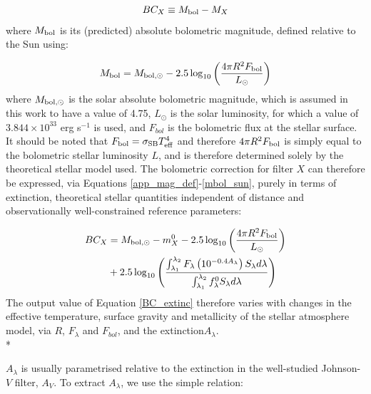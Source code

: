 \documentclass[12pt, a4paper]{report}
\begin{document}
\begin{equation}
BC_{X} \equiv M_{\textnormal{bol}} - M_{X}
\label{BC_def}
\end{equation}
where $M_{\textnormal{bol}}$ is its (predicted) absolute bolometric magnitude, defined relative to the Sun using:

\begin{equation}
M_{\textnormal{bol}} = M_{\textnormal{bol},\odot} - 2.5 \log_{10} \left( \frac{4\pi R^{2}F_{\textnormal{bol}}}{L_{\odot}} \right)
\label{mbol_sun}
\end{equation}
where $M_{\textnormal{bol},\odot}$ is the solar absolute bolometric magnitude, which is assumed in this work to have a value of 4.75, $L_{\odot}$ is the solar luminosity, for which a value of $3.844 \times 10^{33}$ erg s$^{-1}$ is used, and $F_{bol}$ is the bolometric flux at the stellar surface. It should be noted that $F_{\textnormal{bol}} = \sigma_{\textnormal{SB}} T_{\textnormal{eff}}^{4}$ and therefore $4\pi R^{2}F_{\textnormal{bol}}$ is simply equal to the bolometric stellar luminosity $L$, and is therefore determined solely by the theoretical stellar model used. The bolometric correction for filter $X$ can therefore be expressed, via Equations \ref{app_mag_def}-\ref{mbol_sun}, purely in terms of extinction, theoretical stellar quantities independent of distance and observationally well-constrained reference parameters:

\begin{align}
\begin{split}
BC_{X} &= M_{\textnormal{bol},\odot} - m_{X}^{0} - 2.5 \log_{10} \left( \frac{4\pi R^{2}F_{\textnormal{bol}}}{L_{\odot}} \right) \\
&+ 2.5 \log_{10} \left( \frac{\int_{\lambda_{1}}^{\lambda_{2}} F_{\lambda} \left( 10^{-0.4 A_{\lambda}} \right) S_{\lambda} d\lambda}{\int_{\lambda_{1}}^{\lambda_{2}} f_{\lambda}^{0} S_{\lambda} d\lambda} \right)
\label{BC_extinc}
\end{split}
\end{align}
The output value of Equation \ref{BC_extinc} therefore varies with changes in the effective temperature, surface gravity and metallicity of the stellar atmosphere model, via $R$, $F_{\lambda}$ and $F_{bol}$, and the extinction$ A_{\lambda}$.\\*


$A_{\lambda}$ is usually parametrised relative to the extinction in the well-studied Johnson-$V$ filter, $A_{V}$. To extract $A_{\lambda}$, we use the simple relation:
\end{document}
